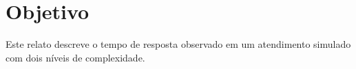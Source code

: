 \section{Objetivo}
Este relato descreve o tempo de resposta observado em um atendimento simulado com dois níveis de complexidade.
